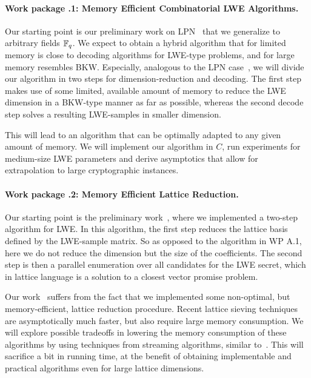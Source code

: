 \renewcommand{\theworkpackage}{\Alph{workpackage}}
\setcounter{workpackage}{0}
\label{am:wp:eins}


\paragraph{Work package \theworkpackage.1: Memory Efficient Combinatorial LWE Algorithms.}

Our starting point is our preliminary work on LPN~\cite{LPN} that we generalize to arbitrary fields $\mathbb{F}_q$. We expect to obtain a hybrid algorithm that for limited memory is close to decoding algorithms for LWE-type problems, and for large memory resembles BKW. Especially, analogous to the LPN case~\cite{LPN}, we will divide our algorithm in two steps for dimension-reduction and decoding. The first step makes use of some limited, available amount of memory to reduce the LWE dimension in a BKW-type manner as far as possible, whereas the second decode step solves a resulting LWE-samples in smaller dimension.

This will lead to an algorithm that can be optimally adapted to any given amount of memory. We will implement our algorithm in $C$, run experiments for medium-size LWE parameters and derive asymptotics that allow for extrapolation to large cryptographic instances.

\paragraph{Work package \theworkpackage.2: Memory Efficient Lattice Reduction.} 

Our starting point is the preliminary work~\cite{BDD}, where we implemented a two-step algorithm for LWE. In this algorithm, the first step reduces the lattice basis defined by the LWE-sample matrix. So as opposed to the algorithm in WP A.1, here we do not reduce the dimension but the size of the coefficients. The second step is then a parallel enumeration over all candidates for the LWE secret, which in lattice language is a solution to a closest vector promise problem.

Our work~\cite{BDD} suffers from the fact that we implemented some non-optimal, but memory-efficient, lattice reduction procedure. Recent lattice sieving techniques~\cite{DBLP:conf/stoc/AggarwalDRS15} are asymptotically much faster, but also require large memory consumption. We will explore possible tradeoffs in lowering the memory consumption of these algorithms by using techniques from streaming algorithms, similar to~\cite{LPN}. This will sacrifice a bit in running time, at the benefit of obtaining implementable and practical algorithms even for large lattice dimensions.

